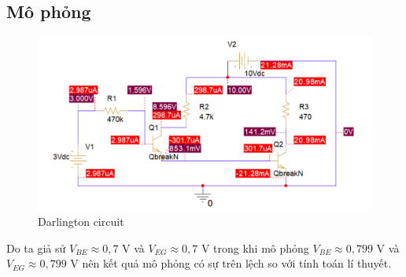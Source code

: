 \subsection{Mô phỏng}
\begin{figure}[ht]
    \centering
    \includegraphics[scale=0.3]{graphics/ex9/f2.png}
    \caption{Darlington circuit}
\end{figure}

Do ta giả sử \(V_{BE} \approx 0,7 \) V và \(V_{EG} \approx 0,7 \) V trong khi mô phỏng \(V_{BE} \approx 0,799 \) V và \(V_{EG} \approx 0,799 \) V nên kết quả mô phỏng có sự trên lệch so với tính toán lí thuyết.

\pagebreak